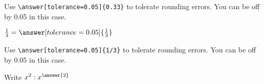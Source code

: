 \documentclass{ximera}
\begin{document}
\begin{exercise}
\begin{question}
            Use \verb|\answer[tolerance=0.05]{0.33}| to tolerate rounding errors. You can be off by 0.05 in this case.
        \end{question}

        \begin{question}
            $\frac{1}{3} =  \answer[tolerance=0.05]{\frac{1}{3}}$  

            Use \verb|\answer[tolerance=0.05]{1/3}| to tolerate rounding errors. You can be off by 0.05 in this case.
        \end{question}




        \begin{question} Write $x^2: x^{\answer{2}}$
        \end{question}


    \end{exercise}


\end{document}

